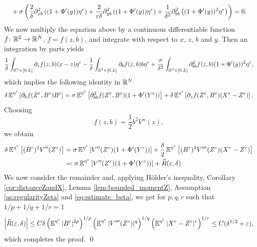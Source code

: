 \documentclass[10pt]{article}
\begin{document}
\begin{appendices}
\begin{equation}
\begin{aligned}
	&\quad + \sigma \left( \frac2\delta \partial_{xb}^2 \left( (1+\Phi'(y)) \eta^\varepsilon \right) + \frac2{\varepsilon\delta}\partial_{yb}^2 \left( (1+\Phi'(y))\eta^\varepsilon \right) + \frac1{\delta^2}\partial_{bb}^2 \left( (1+\Phi'(y))^2 \eta^\varepsilon \right) \right) = 0.
	\end{aligned}
	\end{equation}
	We now multiply the equation above by a continuous differentiable function $f \colon \mathbb{R}^2 \to \mathbb{R}^N$, $f = f(z,b)$, and integrate with respect to $x$, $z$, $b$ and $y$. Then an integration by parts yields
	\begin{equation}
	\frac1\delta \int_{\mathbb{R}^3 \times [0,L]} \partial_z f(z,b) (x-z) \eta^\varepsilon - \frac1\delta \int_{\mathbb{R}^3 \times [0,L]} \partial_b f(z,b) b \eta^\varepsilon + \frac{\sigma}{\delta^2} \int_{\mathbb{R}^3 \times [0,L]} \partial_{bb}^2 f(z,b) (1+\Phi'(y))^2 \eta^\varepsilon,
	\end{equation}
	which implies the following identity in $\mathbb{R}^N$
	\begin{equation}
	\delta \operatorname{\mathbb{E}}^{\eta^\varepsilon}\left[ \partial_b f(Z^\varepsilon, B^\varepsilon) B^\varepsilon \right] = \sigma \operatorname{\mathbb{E}}^{\eta^\varepsilon} \left[ \partial_{bb}^2 f(Z^\varepsilon, B^\varepsilon) (1+\Phi'(Y^\varepsilon)) \right] + \delta \operatorname{\mathbb{E}}^{\eta^\varepsilon} \left[ \partial_z f(Z^\varepsilon, B^\varepsilon) (X^\varepsilon-Z^\varepsilon) \right].
	\end{equation}
	Choosing
	\begin{equation}
	f(z,b) = \frac12 b^2 V''(z),
	\end{equation}
	we obtain
	\begin{equation}
	\begin{aligned}
	\delta \operatorname{\mathbb{E}}^{\eta^\varepsilon}\left[ (B^\varepsilon)^2 V''(Z^\varepsilon) \right] &= \sigma \operatorname{\mathbb{E}}^{\eta^\varepsilon} \left[ V''(Z^\varepsilon) (1+\Phi'(Y^\varepsilon)) \right] + \frac\delta2 \operatorname{\mathbb{E}}^{\eta^\varepsilon} \left[ (B^\varepsilon)^2 V'''(Z^\varepsilon) (X^\varepsilon-Z^\varepsilon) \right] \\
	&\eqqcolon \sigma \operatorname{\mathbb{E}}^{\eta^\varepsilon} \left[ V''(Z^\varepsilon) (1+\Phi'(Y^\varepsilon)) \right] + \widetilde R(\varepsilon,\delta).
	\end{aligned}
	\end{equation}
	We now consider the remainder and, applying Hölder's inequality, Corollary \ref{cor:distanceZandX}, Lemma \ref{lem:bounded_momentZ}, Assumption \ref{as:regularityZeta} and \eqref{eq:estimate_beta}, we get for $p,q,r$ such that $1/p+1/q+1/r=1$
	\begin{equation}
	\left| \widetilde R(\varepsilon,\delta) \right| \le C \delta \left( \operatorname{\mathbb{E}}^{\eta^\varepsilon} |B^\varepsilon|^{2p} \right)^{1/p} \left( \operatorname{\mathbb{E}}^{\eta^\varepsilon} |V'''(Z^\varepsilon)|^q \right)^{1/q} \left( \operatorname{\mathbb{E}}^{\eta^\varepsilon} |X^\varepsilon - Z^\varepsilon|^r \right)^{1/r} \le C (\delta^{1/2} + \varepsilon),
	\end{equation}
	which completes the proof. \qed 


\end{appendices}
\end{document}
